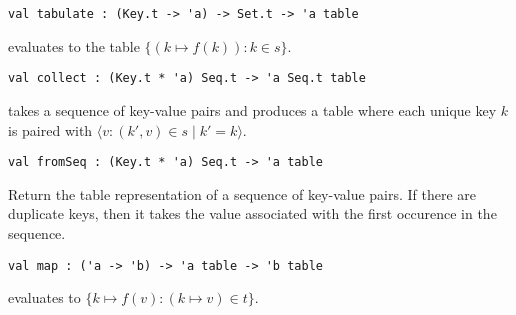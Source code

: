 \begin{cluster}
\label{grp:grm:ordtable-interface::tabulate}

\begin{gram}[tabulate]
\label{grm:ordtable-interface::tabulate}
\begin{verbatim}
val tabulate : (Key.t -> 'a) -> Set.t -> 'a table
\end{verbatim}
 evaluates to the table $\{(k \mapsto f(k)) : k \in s\}$.

\end{gram}
\end{cluster}

\begin{cluster}
\label{grp:grm:ordtable-interface::collect}

\begin{gram}[collect]
\label{grm:ordtable-interface::collect}
\begin{verbatim}
val collect : (Key.t * 'a) Seq.t -> 'a Seq.t table
\end{verbatim}
 takes a sequence of key-value pairs and produces a table where
each unique key $k$ is paired with
$\langle v : (k',v) \in s \mathbin| k' = k \rangle$.

\end{gram}
\end{cluster}

\begin{cluster}
\label{grp:grm:ordtable-interface::fromseq}

\begin{gram}[fromSeq]
\label{grm:ordtable-interface::fromseq}
\begin{verbatim}
val fromSeq : (Key.t * 'a) Seq.t -> 'a table
\end{verbatim}
Return the table representation of a sequence of key-value pairs. If there are
duplicate keys, then it takes the value associated with the first occurence in
the sequence.

\end{gram}
\end{cluster}

\begin{cluster}
\label{grp:grm:ordtable-interface::map}

\begin{gram}[map]
\label{grm:ordtable-interface::map}
\begin{verbatim}
val map : ('a -> 'b) -> 'a table -> 'b table
\end{verbatim}
 evaluates to $\{k \mapsto f(v) : (k \mapsto v) \in t\}$.

\end{gram}
\end{cluster}

